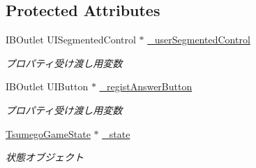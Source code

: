 \subsection*{Protected Attributes}
\begin{DoxyCompactItemize}
\item 
\hypertarget{interface_tsumego_regist_view_controller_a8818ed1e51e7a58634428b12c629903f}{
IBOutlet UISegmentedControl $\ast$ \hyperlink{interface_tsumego_regist_view_controller_a8818ed1e51e7a58634428b12c629903f}{\_\-userSegmentedControl}}
\label{interface_tsumego_regist_view_controller_a8818ed1e51e7a58634428b12c629903f}

\begin{DoxyCompactList}\small\item\em プロパティ受け渡し用変数 \end{DoxyCompactList}\item 
\hypertarget{interface_tsumego_regist_view_controller_a7f5838a4ea792f976fdf51e1de95b0ba}{
IBOutlet UIButton $\ast$ \hyperlink{interface_tsumego_regist_view_controller_a7f5838a4ea792f976fdf51e1de95b0ba}{\_\-registAnswerButton}}
\label{interface_tsumego_regist_view_controller_a7f5838a4ea792f976fdf51e1de95b0ba}

\begin{DoxyCompactList}\small\item\em プロパティ受け渡し用変数 \end{DoxyCompactList}\item 
\hypertarget{interface_tsumego_regist_view_controller_ad8f5643e96dfa2cf9ecbeeb74328d5eb}{
\hyperlink{interface_tsumego_game_state}{TsumegoGameState} $\ast$ \hyperlink{interface_tsumego_regist_view_controller_ad8f5643e96dfa2cf9ecbeeb74328d5eb}{\_\-state}}
\label{interface_tsumego_regist_view_controller_ad8f5643e96dfa2cf9ecbeeb74328d5eb}

\begin{DoxyCompactList}\small\item\em 状態オブジェクト \end{DoxyCompactList}\end{DoxyCompactItemize}
